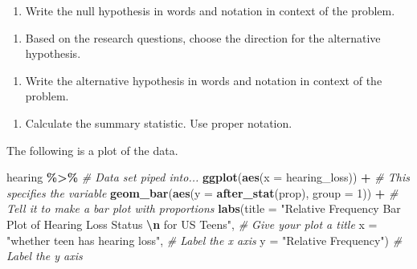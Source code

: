 \documentclass[
]{report}
\newenvironment{Shaded}{\begin{snugshade}}{\end{snugshade}}
\newcommand{\AttributeTok}[1]{\textcolor[rgb]{0.13,0.29,0.53}{#1}}
\newcommand{\CommentTok}[1]{\textcolor[rgb]{0.56,0.35,0.01}{\textit{#1}}}
\newcommand{\DecValTok}[1]{\textcolor[rgb]{0.00,0.00,0.81}{#1}}
\newcommand{\FunctionTok}[1]{\textcolor[rgb]{0.13,0.29,0.53}{\textbf{#1}}}
\newcommand{\NormalTok}[1]{#1}
\newcommand{\SpecialCharTok}[1]{\textcolor[rgb]{0.81,0.36,0.00}{\textbf{#1}}}
\newcommand{\StringTok}[1]{\textcolor[rgb]{0.31,0.60,0.02}{#1}}
\providecommand{\tightlist}{%
  \setlength{\itemsep}{0pt}\setlength{\parskip}{0pt}}
\begin{document}
\vspace{0.8in}

\begin{enumerate}
\def\labelenumi{\arabic{enumi}.}
\setcounter{enumi}{1}
\tightlist
\item
  Write the null hypothesis in words and notation in context of the problem.
\end{enumerate}

\vspace{1in}

\begin{enumerate}
\def\labelenumi{\arabic{enumi}.}
\setcounter{enumi}{2}
\tightlist
\item
  Based on the research questions, choose the direction for the alternative hypothesis.
\end{enumerate}

\vspace{0.3in}

\begin{enumerate}
\def\labelenumi{\arabic{enumi}.}
\setcounter{enumi}{3}
\tightlist
\item
  Write the alternative hypothesis in words and notation in context of the problem.
\end{enumerate}

\vspace{1in}

\begin{enumerate}
\def\labelenumi{\arabic{enumi}.}
\setcounter{enumi}{4}
\tightlist
\item
  Calculate the summary statistic. Use proper notation.
\end{enumerate}

\vspace{0.4in}

The following is a plot of the data.

\begin{Shaded}
\begin{Highlighting}[]
\NormalTok{hearing }\SpecialCharTok{\%\textgreater{}\%} \CommentTok{\# Data set piped into...}
    \FunctionTok{ggplot}\NormalTok{(}\FunctionTok{aes}\NormalTok{(}\AttributeTok{x =}\NormalTok{ hearing\_loss)) }\SpecialCharTok{+}   \CommentTok{\# This specifies the variable}
    \FunctionTok{geom\_bar}\NormalTok{(}\FunctionTok{aes}\NormalTok{(}\AttributeTok{y =} \FunctionTok{after\_stat}\NormalTok{(prop), }\AttributeTok{group =} \DecValTok{1}\NormalTok{)) }\SpecialCharTok{+}  \CommentTok{\# Tell it to make a bar plot with proportions}
    \FunctionTok{labs}\NormalTok{(}\AttributeTok{title =} \StringTok{"Relative Frequency Bar Plot of Hearing Loss Status }\SpecialCharTok{\textbackslash{}n}\StringTok{ for US Teens"}\NormalTok{,  }
       \CommentTok{\# Give your plot a title}
       \AttributeTok{x =} \StringTok{"whether teen has hearing loss"}\NormalTok{,   }\CommentTok{\# Label the x axis}
       \AttributeTok{y =} \StringTok{"Relative Frequency"}\NormalTok{)  }\CommentTok{\# Label the y axis}
\end{Highlighting}
\end{Shaded}
\end{document}
